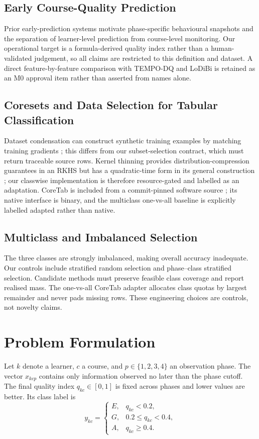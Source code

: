 \documentclass[runningheads]{llncs}
\begin{document}
\subsection{Early Course-Quality Prediction}
Prior early-prediction systems motivate phase-specific behavioural snapshots
and the separation of learner-level prediction from course-level monitoring.
Our operational target is a formula-derived quality index rather than a
human-validated judgement, so all claims are restricted to this definition and
dataset.  A direct feature-by-feature comparison with TEMPO-DQ and LoDiBi is
retained as an M0 approval item rather than asserted from names alone.
\subsection{Coresets and Data Selection for Tabular Classification}
Dataset condensation can construct synthetic training examples by matching
training gradients \cite{zhao2021datasetcondensation}; this differs from our
subset-selection contract, which must return traceable source rows.  Kernel
thinning provides distribution-compression guarantees in an RKHS but has a
quadratic-time form in its general construction \cite{dwivedi2024kernel}; our
classwise implementation is therefore resource-gated and labelled as an
adaptation.  CoreTab is included from a commit-pinned software source
\cite{hadarcoretabsoftware}; its native interface is binary, and the multiclass
one-vs-all baseline is explicitly labelled adapted rather than native.
\subsection{Multiclass and Imbalanced Selection}
The three classes are strongly imbalanced, making overall accuracy inadequate.
Our controls include stratified random selection and phase--class stratified
selection.  Candidate methods must preserve feasible class coverage and report
realised mass.  The one-vs-all CoreTab adapter allocates class quotas by largest
remainder and never pads missing rows.  These engineering choices are controls,
not novelty claims.

\section{Problem Formulation}
Let $k$ denote a learner, $c$ a course, and
$p\in\{1,2,3,4\}$ an observation phase.  The vector $x_{kcp}$ contains only
information observed no later than the phase cutoff.  The final quality index
$q_{kc}\in[0,1]$ is fixed across phases and lower values are better.  Its class
label is
\[
y_{kc}=\begin{cases}
E,&q_{kc}<0.2,\\
G,&0.2\le q_{kc}<0.4,\\
A,&q_{kc}\ge 0.4.
\end{cases}
\]
\end{document}

